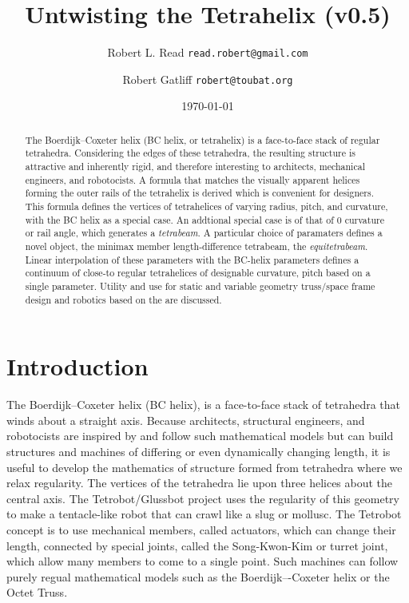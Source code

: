 \documentclass[11pt]{article}
\title{Untwisting the Tetrahelix (v0.5)}
\author{Robert L. Read \texttt{read.robert@gmail.com} \and
  Robert Gatliff \texttt{robert@toubat.org}
}
\date{\today}
\begin{document}
\maketitle


\begin{abstract}
  The Boerdijk--Coxeter helix (BC helix, or tetrahelix) is a face-to-face stack of regular tetrahedra.
  Considering the edges of these tetrahedra, the resulting structure is attractive and inherently rigid,
  and therefore interesting to architects, mechanical engineers,
  and robotocists.
  A formula that matches the visually apparent helices forming the outer rails of the tetrahelix is derived which
  is convenient for designers.
  This formula defines the vertices of tetrahelices of varying radius, pitch, and curvature, with the BC helix
  as a special case. 
  An addtional special case is of that of $0$ curvature or rail angle, which generates a \emph{tetrabeam}.
  A particular choice of paramaters defines a novel object, the  minimax member length-difference tetrabeam,
  the \emph{equitetrabeam}.
  Linear interpolation of these parameters with the BC-helix parameters defines a continuum of close-to regular
  tetrahelices of designable curvature, pitch based on a single parameter.
  Utility and use for static and variable geometry truss/space frame design and robotics based on the are discussed.
\end{abstract}


\section{Introduction}

The Boerdijk--Coxeter helix\cite{coxeter1985simplicial} (BC helix),
is a face-to-face stack of tetrahedra that winds about a straight axis.
Because architects, structural engineers, and robotocists are inspired by and follow such mathematical models but can build
structures and machines of differing or even dynamically changing length, it is useful to develop
the mathematics of structure formed from tetrahedra where we relax regularity.
The vertices of the tetrahedra
lie upon three
helices about the central axis.
The Tetrobot/Glussbot\cite{TetrobotBook} project
uses the regularity of this geometry to make a tentacle-like robot that can crawl like a slug or mollusc.
The Tetrobot concept
is to use mechanical members, called actuators, which can change their length, connected by special joints, called the Song-Kwon-Kim\cite{song2003spherical} or turret joint,
which allow many
members to come to a single point.
Such machines can follow purely regual mathematical models such as the Boerdijk–-Coxeter helix or the Octet Truss\cite{richard1961synergetic}.
\end{document}
